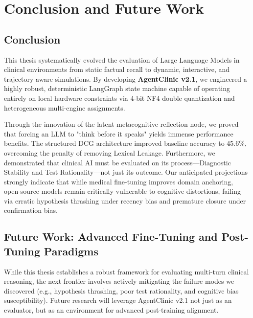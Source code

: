 \documentclass[12pt, a4paper, twoside]{report}
\begin{document}
\chapter{Conclusion and Future Work}

\section{Conclusion}
This thesis systematically evolved the evaluation of Large Language Models in clinical environments from static factual recall to dynamic, interactive, and trajectory-aware simulations. By developing \textbf{AgentClinic v2.1}, we engineered a highly robust, deterministic LangGraph state machine capable of operating entirely on local hardware constraints via 4-bit NF4 double quantization and heterogeneous multi-engine assignments.

Through the innovation of the latent metacognitive reflection node, we proved that forcing an LLM to "think before it speaks" yields immense performance benefits. The structured DCG architecture improved baseline accuracy to 45.6\%, overcoming the penalty of removing Lexical Leakage. Furthermore, we demonstrated that clinical AI must be evaluated on its process—Diagnostic Stability and Test Rationality—not just its outcome. Our anticipated projections strongly indicate that while medical fine-tuning improves domain anchoring, open-source models remain critically vulnerable to cognitive distortions, failing via erratic hypothesis thrashing under recency bias and premature closure under confirmation bias.

\section{Future Work: Advanced Fine-Tuning and Post-Tuning Paradigms}
While this thesis establishes a robust framework for evaluating multi-turn clinical reasoning, the next frontier involves actively mitigating the failure modes we discovered (e.g., hypothesis thrashing, poor test rationality, and cognitive bias susceptibility). Future research will leverage AgentClinic v2.1 not just as an evaluator, but as an environment for advanced post-training alignment.
\end{document}
